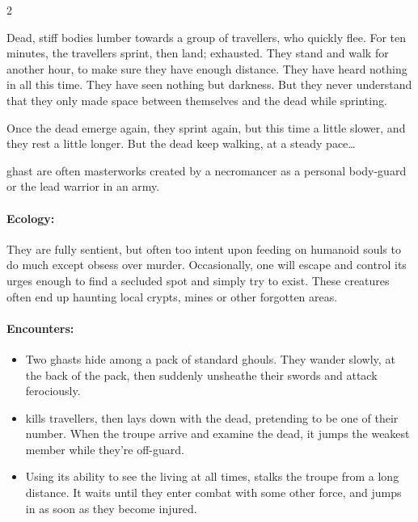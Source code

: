 \begin{multicols}{2}
\begin{exampletext}
  Dead, stiff bodies lumber towards a group of travellers, who quickly flee.
  For ten minutes, the travellers sprint, then land; exhausted.
  They stand and walk for another hour, to make sure they have enough distance.
  They have heard nothing in all this time.
  They have seen nothing but darkness.
  But they never understand that they only made space between themselves and the dead while sprinting.

  Once the dead emerge again, they sprint again, but this time a little slower, and they rest a little longer.
  But the dead keep walking, at a steady pace\ldots
\end{exampletext}

  {ghast}%
are often masterworks created by a necromancer as a personal body-guard or the lead warrior in an army.

\paragraph{Ecology:} They are fully sentient, but often too intent upon feeding on humanoid souls to do much except obsess over murder.
Occasionally, one will escape and control its urges enough to find a secluded spot and simply try to exist.
These creatures often end up haunting local crypts, mines or other forgotten areas.

\paragraph{Encounters:}

\null
\begin{itemize}
  \item
  Two \glspl{ghast} hide among a pack of standard \glspl{ghoul}.
  They wander slowly, at the back of the pack, then suddenly unsheathe their swords and attack ferociously.
  \item
   kills travellers, then lays down with the dead, pretending to be one of their number.
  When the troupe arrive and examine the dead, it jumps the weakest member while they're off-guard.
  \item
  Using its ability to see the living at all times,  stalks the troupe from a long distance.
  It waits until they enter combat with some other force, and jumps in as soon as they become injured.
\end{itemize}


\end{multicols}
